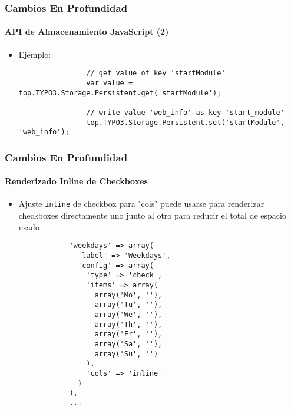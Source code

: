 \begin{frame}[fragile]
	\frametitle{Cambios En Profundidad}
	\framesubtitle{API de Almacenamiento JavaScript (2)}

	\begin{itemize}
		\item Ejemplo:
			\begin{lstlisting}
				// get value of key 'startModule'
				var value = top.TYPO3.Storage.Persistent.get('startModule');

				// write value 'web_info' as key 'start_module'
				top.TYPO3.Storage.Persistent.set('startModule', 'web_info');
			\end{lstlisting}

	\end{itemize}

\end{frame}


\begin{frame}[fragile]
	\frametitle{Cambios En Profundidad}
	\framesubtitle{Renderizado Inline de Checkboxes}

	\lstset{basicstyle=\tiny\ttfamily}

	\begin{itemize}

		\item Ajuste \texttt{inline} de checkbox para "cols" puede usarse para renderizar checkboxes
			directamente uno junto al otro para reducir el total de espacio usado

		\begin{lstlisting}
			'weekdays' => array(
			  'label' => 'Weekdays',
			  'config' => array(
			    'type' => 'check',
			    'items' => array(
			      array('Mo', ''),
			      array('Tu', ''),
			      array('We', ''),
			      array('Th', ''),
			      array('Fr', ''),
			      array('Sa', ''),
			      array('Su', '')
			    ),
			    'cols' => 'inline'
			  )
			),
			...
		\end{lstlisting}

	\end{itemize}

\end{frame}

